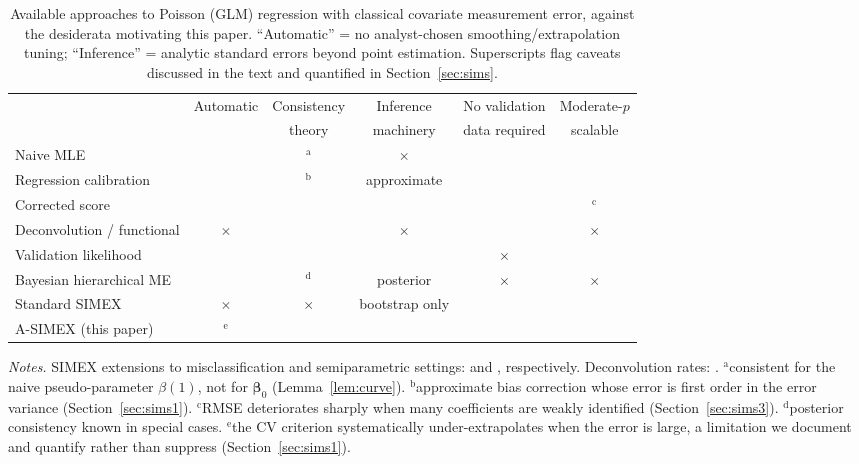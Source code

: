 \documentclass[3p,11pt]{elsarticle}
\theoremstyle{plain}
\theoremstyle{definition}
\newcommand{\bet}{\bm{\beta}}
\providecommand{\cmark}{\checkmark}
\providecommand{\xmark}{$\times$}
\newcommand{\asimex}{\textup{A-SIMEX}}
\begin{document}
\begin{table}[t]
\centering\footnotesize
\setlength{\tabcolsep}{4pt}
\caption{Available approaches to Poisson (GLM) regression with
classical covariate measurement error, against the desiderata
motivating this paper. ``Automatic'' = no analyst-chosen
smoothing/extrapolation tuning; ``Inference'' = analytic standard
errors beyond point estimation. Superscripts flag caveats discussed in
the text and quantified in Section~\ref{sec:sims}.}
\label{tab:gap}
\begin{tabular}{p{5.6cm}ccccc}
\toprule
 & Automatic & Consistency & Inference & No validation & Moderate-$p$ \\
 &  & theory & machinery & data required & scalable \\
\midrule
Naive MLE \citep{fuller1987} & \cmark & $^{\mathrm{a}}$ & \xmark & \cmark & \cmark \\
Regression calibration \citep{prentice1982,rosner1989} & \cmark & $^{\mathrm{b}}$ & approximate & \cmark & \cmark \\
Corrected score \citep{nakamura1990} & \cmark & \cmark & \cmark & \cmark & $^{\mathrm{c}}$ \\
Deconvolution / functional \citep{fan1991,delaigle2008} & \xmark & \cmark & \xmark & \cmark & \xmark \\
Validation likelihood \citep{qin2000,chen2011} & \cmark & \cmark & \cmark & \xmark & \cmark \\
Bayesian hierarchical ME \citep{richardson1993,berry2002} & \cmark & $^{\mathrm{d}}$ & posterior & \xmark & \xmark \\
Standard SIMEX \citep{cook1994,stefanski1995} & \xmark & \xmark & bootstrap only & \cmark & \cmark \\
\midrule
\asimex{} (this paper) & \cmark$^{\mathrm{e}}$ & \cmark & \cmark & \cmark & \cmark \\
\bottomrule
\end{tabular}

{\footnotesize\emph{Notes.} SIMEX extensions to misclassification and
semiparametric settings: \citet{kuechenhoff2006} and
\citet{apanasovich2009}, respectively. Deconvolution rates:
\citet{fan1993}.
$^{\mathrm{a}}$consistent for the naive pseudo-parameter $\beta(1)$,
not for $\bet_0$ (Lemma~\ref{lem:curve}).
$^{\mathrm{b}}$approximate bias correction whose error is first order
in the error variance (Section~\ref{sec:sims1}).
$^{\mathrm{c}}$RMSE deteriorates sharply when many coefficients are
weakly identified (Section~\ref{sec:sims3}).
$^{\mathrm{d}}$posterior consistency known in special cases.
$^{\mathrm{e}}$the CV criterion systematically under-extrapolates when
the error is large, a limitation we document and quantify rather
than suppress (Section~\ref{sec:sims1}).}
\end{table}
\end{document}
